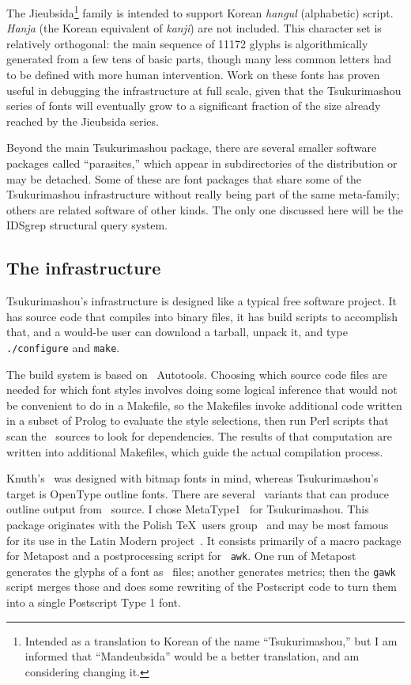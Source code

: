 \documentclass{ltugboat}
\begin{document}
The Jieubsida\footnote{Intended as a translation to Korean of the name
``Tsukurimashou,'' but I am informed that ``Mandeubsida'' would be a better
translation, and am considering changing it.} family is intended to support
Korean \emph{hangul} (alphabetic) script.  \emph{Hanja} (the Korean
equivalent of \emph{kanji}) are not included.  This character set is
relatively orthogonal: the main sequence of 11172 glyphs is algorithmically
generated from a few tens of basic parts, though many less common letters
had to be defined with more human intervention.  Work on these fonts has
proven useful in debugging the infrastructure at full scale, given that the
Tsukurimashou series of fonts will eventually grow to a significant fraction
of the size already reached by the Jieubsida series.

Beyond the main Tsukurimashou package, there are several smaller software
packages called ``parasites,'' which appear in subdirectories of the
distribution or may be detached.  Some of these are font packages that share
some of the Tsukurimashou infrastructure without really being part of the
same meta-family; others are related software of other kinds.  The only one
discussed here will be the IDSgrep structural query system.

\subsection{The infrastructure}

Tsukurimashou's infrastructure is designed like a typical free software
project.  It has source code that compiles into binary files, it has build
scripts to accomplish that, and a would-be user can download a tarball,
unpack it, and type \texttt{./configure} and \texttt{make}.

The build system is based on \GNU\ Autotools.  Choosing which source code
files are needed for which font styles involves doing some logical inference
that would not be convenient to do in a Makefile, so the Makefiles invoke
additional code written in a subset of Prolog to evaluate the style
selections, then run Perl scripts that scan the \MF\ sources to look for
dependencies.  The results of that computation are written into additional
Makefiles, which guide the actual compilation process.

Knuth's \MF\ was designed with bitmap fonts in mind, whereas Tsukurimashou's
target is OpenType outline fonts.  There are several \MF\ variants that can
produce outline output from \MF\ source.  I chose
MetaType1~\cite{Jackowski:Programming} for
Tsukurimashou.  This package originates with the Polish \TeX\ users group
\ and may be most famous for its use in the Latin Modern
project~\cite{Jackowski:Latin}.  It consists
primarily of a macro package for Metapost and a postprocessing script for
\GNU\ \texttt{awk}.  One run of Metapost generates the glyphs of a font as
\EPS\ files; another generates metrics; then the \texttt{gawk} script merges
those and does some rewriting of the Postscript code to turn them into a
single Postscript Type 1 font.
\end{document}
